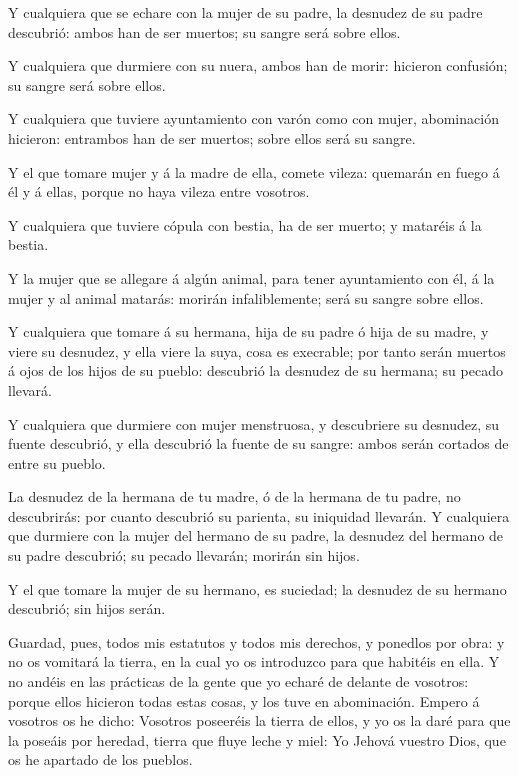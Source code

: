  Y cualquiera que se echare con la mujer de su padre, la
desnudez de su padre descubrió: ambos han de ser muertos; su sangre será
sobre ellos.

 Y cualquiera que durmiere con su nuera, ambos han de
morir: hicieron confusión; su sangre será sobre ellos.

 Y cualquiera que tuviere ayuntamiento con varón como con
mujer, abominación hicieron: entrambos han de ser muertos; sobre ellos
será su sangre.

 Y el que tomare mujer y á la madre de ella, comete vileza:
quemarán en fuego á él y á ellas, porque no haya vileza entre vosotros.

 Y cualquiera que tuviere cópula con bestia, ha de ser
muerto; y mataréis á la bestia.

 Y la mujer que se allegare á algún animal, para tener
ayuntamiento con él, á la mujer y al animal matarás: morirán
infaliblemente; será su sangre sobre ellos.

 Y cualquiera que tomare á su hermana, hija de su padre ó
hija de su madre, y viere su desnudez, y ella viere la suya, cosa es
execrable; por tanto serán muertos á ojos de los hijos de su pueblo:
descubrió la desnudez de su hermana; su pecado llevará.

 Y cualquiera que durmiere con mujer menstruosa, y
descubriere su desnudez, su fuente descubrió, y ella descubrió la fuente
de su sangre: ambos serán cortados de entre su pueblo.

 La desnudez de la hermana de tu madre, ó de la hermana de
tu padre, no descubrirás: por cuanto descubrió su parienta, su iniquidad
llevarán.  Y cualquiera que durmiere con la mujer del
hermano de su padre, la desnudez del hermano de su padre descubrió; su
pecado llevarán; morirán sin hijos.

 Y el que tomare la mujer de su hermano, es suciedad; la
desnudez de su hermano descubrió; sin hijos serán.

 Guardad, pues, todos mis estatutos y todos mis derechos, y
ponedlos por obra: y no os vomitará la tierra, en la cual yo os
introduzco para que habitéis en ella.  Y no andéis en las
prácticas de la gente que yo echaré de delante de vosotros: porque ellos
hicieron todas estas cosas, y los tuve en abominación. 
Empero á vosotros os he dicho: Vosotros poseeréis la tierra de ellos, y
yo os la daré para que la poseáis por heredad, tierra que fluye leche y
miel: Yo Jehová vuestro Dios, que os he apartado de los pueblos.

